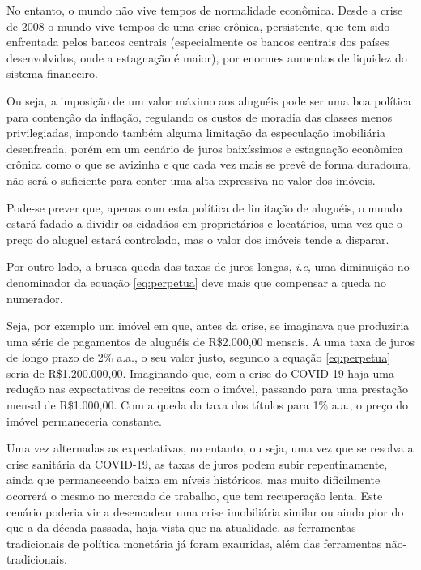 \documentclass[
	12pt,				%
	oneside,			%
	a4paper,			%
	chapter=TITLE,		%
	section=TITLE,		%
	english,			%
	brazil				%
	]{abntex2}
\begin{document}
\begin{refsection}
No entanto, o mundo não vive tempos de normalidade econômica. Desde a crise de
2008 o mundo vive tempos de uma crise crônica, persistente, que tem sido
enfrentada pelos bancos centrais (especialmente os bancos centrais dos países
desenvolvidos, onde a estagnação é maior), por enormes aumentos de liquidez
do sistema financeiro.

Ou seja, a imposição de um valor máximo aos aluguéis pode ser uma boa política
para contenção da inflação, regulando os custos de moradia das classes menos
privilegiadas, impondo também alguma limitação da especulação imobiliária
desenfreada, porém em um cenário de juros baixíssimos e estagnação econômica
crônica como o que se avizinha e que cada vez mais se prevê de forma duradoura,
não será o suficiente para conter uma alta expressiva no valor dos imóveis.

Pode-se prever que, apenas com esta política de limitação de aluguéis, o mundo
estará fadado a dividir os cidadãos em proprietários e locatários, uma vez que o
preço do aluguel estará controlado, mas o valor dos imóveis tende a disparar.

Por outro lado, a brusca queda das taxas de juros longas, \emph{i.e}, uma diminuição
no denominador da equação \eqref{eq:perpetua} deve mais que compensar a queda no
numerador.

Seja, por exemplo um imóvel em que, antes da crise, se imaginava que produziria
uma série de pagamentos de aluguéis de R\$2.000,00 mensais. A uma taxa de juros
de longo prazo de 2\% a.a., o seu valor justo, segundo a equação
\eqref{eq:perpetua} seria de R\$1.200.000,00. Imaginando que, com a crise do
COVID-19 haja uma redução nas expectativas de receitas com o imóvel, passando
para uma prestação mensal de R\$1.000,00. Com a queda da taxa dos títulos para 1\%
a.a., o preço do imóvel permaneceria constante.

Uma vez alternadas as expectativas, no entanto, ou seja, uma vez que se resolva
a crise sanitária da COVID-19, as taxas de juros podem subir repentinamente,
ainda que permanecendo baixa em níveis históricos, mas muito dificilmente
ocorrerá o mesmo no mercado de trabalho, que tem recuperação lenta. Este cenário
poderia vir a desencadear uma crise imobiliária similar ou ainda pior do que a
da década passada, haja vista que na atualidade, as ferramentas tradicionais de
política monetária já foram exauridas, além das ferramentas não-tradicionais.

\printbibliography[heading=subbibintoc]
\end{refsection}
\end{document}
